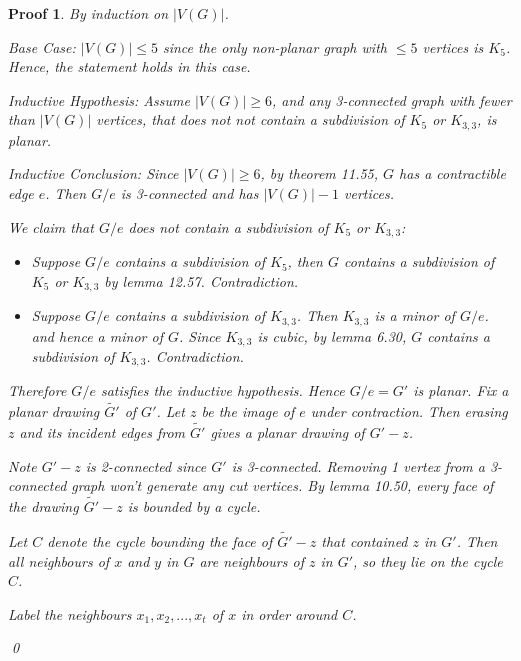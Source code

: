 \documentclass[twoside]{article}
\newtheorem{protoproof}[prototheorem]{Proof}
\renewenvironment{proof}
{\colorlet{shadecolor}{blue!15}\begin{shaded}\begin{protoproof}
		\normalfont}
		{\qed\end{protoproof}\end{shaded}}
\begin{document}
\begin{proof}
	By induction on $|V(G)|$. 
			
	Base Case: $|V(G)| \leq 5$ since the only non-planar graph with $\leq 5$ vertices is $K_5$. Hence, the statement holds in this case. 
			
	Inductive Hypothesis: Assume $|V(G)| \geq 6$, and any 3-connected graph with fewer than $|V(G)|$ vertices, that does not not contain a subdivision of $K_5$ or $K_{3, 3}$, is planar. 
			
	Inductive Conclusion: Since $|V(G)| \geq 6$, by theorem 11.55, $G$ has a contractible edge $e$. Then $G / e$ is 3-connected and has $|V(G)| - 1$ vertices. 
			
	We claim that $G / e$ does not contain a subdivision of $K_5$ or $K_{3, 3}$: \begin{itemize}
	\item Suppose $G / e$ contains a subdivision of $K_5$, then $G$ contains a subdivision of $K_5$ or $K_{3,3}$ by lemma 12.57. Contradiction. 
	\item Suppose $G / e $ contains a subdivision of $K_{3,3}$. Then $K_{3, 3}$ is a minor of $G / e$. and hence a minor of $G$. Since $K_{3,3}$ is cubic, by lemma 6.30, $G$ contains a subdivision of $K_{3,3}$. Contradiction. 
	\end{itemize}
	Therefore $G / e$ satisfies the inductive hypothesis. Hence $G / e  = G'$ is planar. Fix a planar drawing $\tilde{G'}$ of $G'$. Let $z$ be the image of $e$ under contraction. Then erasing $z$ and its incident edges from $\tilde{G'}$ gives a planar drawing of $G' - z$. 
			
	Note $G' - z$ is 2-connected since $G'$ is 3-connected. Removing 1 vertex from a 3-connected graph won't generate any cut vertices. By lemma 10.50, every face of the drawing $\tilde{G'} - z$ is bounded by a cycle. 
			
	Let $C$ denote the cycle bounding the face of $\tilde{G'} - z$ that contained $z$ in $G'$. Then all neighbours of $x$ and $y$ in $G$ are neighbours of $z$ in $G'$, so they lie on the cycle $C$. 
			
	Label the neighbours $x_1, x_2, ..., x_t$ of $x$ in order around $C$. 
			

\end{proof}
\end{document}
